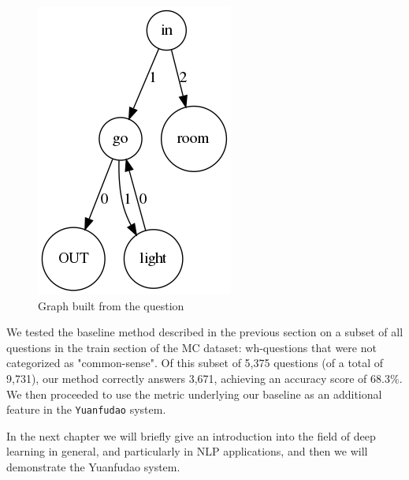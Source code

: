 \begin{figure}
	\centering
	\includegraphics[scale=0.4]{figures/compdef}
	\caption{Graph built from the question}
	\label{fig:merge3}
\end{figure}

We tested the baseline method described in the previous section on a
subset of all questions in the train section of the MC dataset:
wh-questions that were not
categorized as "common-sense". Of this subset of 5,375 questions (of a
total of 9,731), our
method correctly answers 3,671, achieving an accuracy score of $68.3\%$.
We then proceeded to use the metric underlying our baseline as an
additional feature in the \texttt{Yuanfudao} system. 

In the next chapter we will briefly give an introduction into the field of deep learning in general, and particularly in NLP applications, and then we will demonstrate the Yuanfudao system.